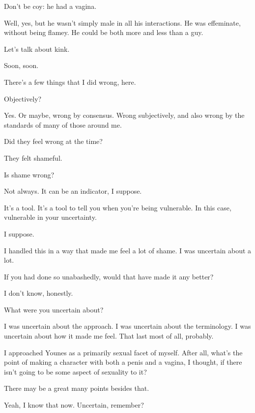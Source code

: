 \begin{ally}
Don't be coy: he had a vagina.
\end{ally}
Well, yes, but he wasn't simply male in all his interactions. He was effeminate, without being flamey. He could be both more and less than a guy.

\begin{ally}
Let's talk about kink.
\end{ally}
Soon, soon.
\newpage

There's a few things that I did wrong, here.

\begin{ally}
Objectively?
\end{ally}
Yes. Or maybe, wrong by consensus. Wrong subjectively, and also wrong by the standards of many of those around me.

\begin{ally}
Did they feel wrong at the time?
\end{ally}
They felt shameful.

\begin{ally}
Is shame wrong?
\end{ally}
Not always. It can be an indicator, I suppose.

\begin{ally}
It's a tool. It's a tool to tell you when you're being vulnerable. In this case, vulnerable in your uncertainty.
\end{ally}
I suppose.

I handled this in a way that made me feel a lot of shame. I was uncertain about a lot.

\begin{ally}
If you had done so unabashedly, would that have made it any better?
\end{ally}
I don't know, honestly.

\begin{ally}
What were you uncertain about?
\end{ally}
I was uncertain about the approach. I was uncertain about the terminology. I was uncertain about how it made me feel. That last most of all, probably.

I approached Younes as a primarily sexual facet of myself. After all, what's the point of making a character with both a penis and a vagina, I thought, if there isn't going to be some aspect of sexuality to it?

\begin{ally}
There may be a great many points besides that.
\end{ally}
Yeah, I know that now. Uncertain, remember?

